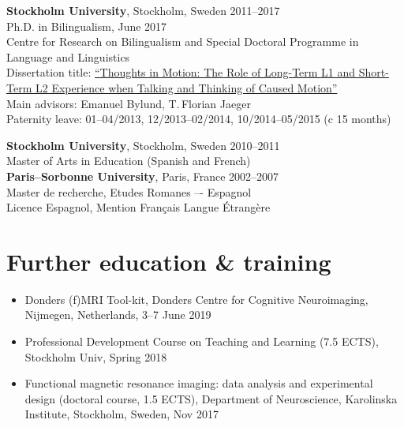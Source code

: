 \documentclass[margin, 11pt]{res} %
\begin{document}
\begin{resume}
{\bf Stockholm University}, Stockholm, Sweden \hfill 2011--2017\\
Ph.D. in Bilingualism, June 2017
\vspace*{.05in}\\
Centre for Research on Bilingualism and Special Doctoral Programme in Language and Linguistics
\vspace*{.05in}\\
Dissertation title:  \href{http://su.diva-portal.org/smash/record.jsf?pid=diva2:1092276}{``Thoughts in Motion: The Role of Long-Term L1 and Short-Term L2 Experience when Talking and Thinking of Caused Motion''}
\vspace*{.05in}\\
Main advisors:  Emanuel Bylund, T.\,Florian Jaeger
\vspace*{.05in}\\
\textcolor{mygray}{Paternity leave: 01--04/2013, 12/2013--02/2014, 10/2014--05/2015 (c 15 months)}

{\bf Stockholm University}, Stockholm, Sweden \hfill 2010--2011\\
Master of Arts in Education (Spanish and French)\\

\vspace*{-.1in}
{\bf Paris--Sorbonne University}, Paris, France \hfill 2002--2007\\
Master de recherche, Etudes Romanes –- Espagnol \\
Licence Espagnol, Mention Fran\c{c}ais Langue \'{E}trang\`{e}re \\
 

\section{\sc Further education \& training}

\begin{itemize}

\item Donders (f)MRI Tool-kit, Donders Centre for Cognitive Neuroimaging, Nijmegen, Netherlands, 3--7 June 2019

\item Professional Development Course on Teaching and Learning (7.5 ECTS), Stockholm Univ, Spring 2018

\item Functional magnetic resonance imaging: data analysis and experimental design (doctoral course, 1.5 ECTS), Department of Neuroscience, Karolinska Institute, Stockholm, Sweden, Nov 2017


\end{itemize}
\end{resume}
\end{document}
